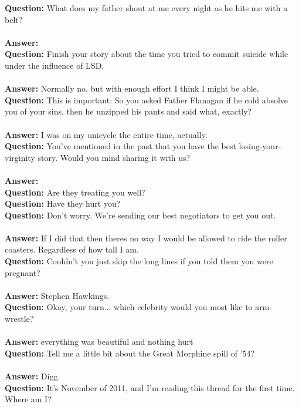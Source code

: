 \documentclass[a4paper]{article}
\begin{document}
\textbf{Question:} What does my father shout at me every night as he hits me with a belt? \\ \\
\textbf{Answer:}  \\
\textbf{Question:} Finish your story about the time you tried to commit suicide while under the influence of LSD. \\ \\
\textbf{Answer:} Normally no, but with enough effort I think I might be able. \\
\textbf{Question:} This is important:
So you asked Father Flanagan if he cold absolve you of your sins, then he unzipped his pants and said what, exactly? \\ \\
\textbf{Answer:} I was on my unicycle the entire time, actually. \\
\textbf{Question:} You've mentioned in the past that you have the best losing-your-virginity story. Would you mind sharing it with us? \\ \\
\textbf{Answer:}  \\
\textbf{Question:} Are they treating you well? \\
\textbf{Question:} Have they hurt you? \\
\textbf{Question:} Don't worry. We're sending our best negotiators to get you out. \\ \\
\textbf{Answer:} If I did that then theres no way I would be allowed to ride the roller coasters. Regardless of how tall I am. \\
\textbf{Question:} Couldn't you just skip the long lines if you told them you were pregnant? \\ \\
\textbf{Answer:} Stephen Hawkings. \\
\textbf{Question:} Okay, your turn... which celebrity would you most like to arm-wrestle? \\ \\
\textbf{Answer:} everything was beautiful and nothing hurt \\
\textbf{Question:} Tell me a little bit about the Great Morphine spill of '54? \\ \\
\textbf{Answer:} Digg. \\
\textbf{Question:} It's November of 2011, and I'm reading this thread for the first time. Where am I? \\ \\
\end{document}
